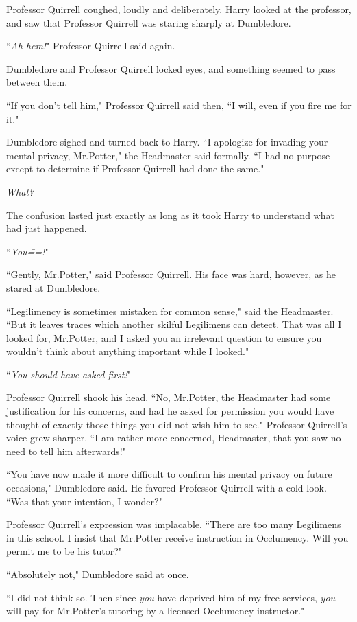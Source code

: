 Professor Quirrell coughed, loudly and deliberately. Harry looked at the professor, and saw that Professor Quirrell was staring sharply at Dumbledore.

``\emph{Ah-hem!}" Professor Quirrell said again.

Dumbledore and Professor Quirrell locked eyes, and something seemed to pass between them.

``If you don't tell him," Professor Quirrell said then, ``I will, even if you fire me for it."

Dumbledore sighed and turned back to Harry. ``I apologize for invading your mental privacy, Mr.\?Potter," the Headmaster said formally. ``I had no purpose except to determine if Professor Quirrell had done the same."

\emph{What?}

The confusion lasted just exactly as long as it took Harry to understand what had just happened.

``\emph{You\===!}"

``Gently, Mr.\?Potter," said Professor Quirrell. His face was hard, however, as he stared at Dumbledore.

``Legilimency is sometimes mistaken for common sense," said the Headmaster. ``But it leaves traces which another skilful Legilimens can detect. That was all I looked for, Mr.\?Potter, and I asked you an irrelevant question to ensure you wouldn't think about anything important while I looked."

``\emph{You should have asked first!}"

Professor Quirrell shook his head. ``No, Mr.\?Potter, the Headmaster had some justification for his concerns, and had he asked for permission you would have thought of exactly those things you did not wish him to see." Professor Quirrell's voice grew sharper. ``I am rather more concerned, Headmaster, that you saw no need to tell him afterwards!"

``You have now made it more difficult to confirm his mental privacy on future occasions," Dumbledore said. He favored Professor Quirrell with a cold look. ``Was that your intention, I wonder?"

Professor Quirrell's expression was implacable. ``There are too many Legilimens in this school. I insist that Mr.\?Potter receive instruction in Occlumency. Will you permit me to be his tutor?"

``Absolutely not," Dumbledore said at once.

``I did not think so. Then since \emph{you} have deprived him of my free services, \emph{you} will pay for Mr.\?Potter's tutoring by a licensed Occlumency instructor."

